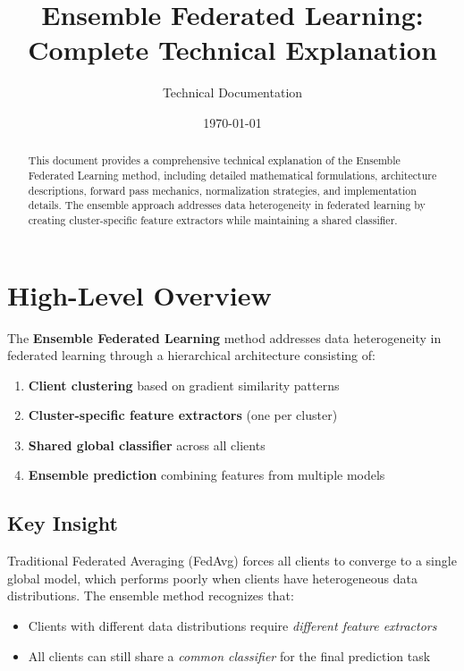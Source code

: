 \documentclass[11pt,a4paper]{article}
\title{\textbf{Ensemble Federated Learning:\\Complete Technical Explanation}}
\author{Technical Documentation}
\date{\today}
\begin{document}
\maketitle

\begin{abstract}
This document provides a comprehensive technical explanation of the Ensemble Federated Learning method, including detailed mathematical formulations, architecture descriptions, forward pass mechanics, normalization strategies, and implementation details. The ensemble approach addresses data heterogeneity in federated learning by creating cluster-specific feature extractors while maintaining a shared classifier.
\end{abstract}

\tableofcontents
\newpage

\section{High-Level Overview}

The \textbf{Ensemble Federated Learning} method addresses data heterogeneity in federated learning through a hierarchical architecture consisting of:

\begin{enumerate}
    \item \textbf{Client clustering} based on gradient similarity patterns
    \item \textbf{Cluster-specific feature extractors} (one per cluster)
    \item \textbf{Shared global classifier} across all clients
    \item \textbf{Ensemble prediction} combining features from multiple models
\end{enumerate}

\subsection{Key Insight}

Traditional Federated Averaging (FedAvg) forces all clients to converge to a single global model, which performs poorly when clients have heterogeneous data distributions. The ensemble method recognizes that:

\begin{itemize}
    \item Clients with different data distributions require \textit{different feature extractors}
    \item All clients can still share a \textit{common classifier} for the final prediction task
\end{itemize}
\end{document}

